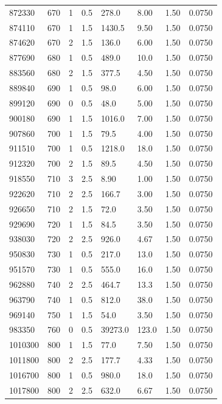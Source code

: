 \documentclass[preview]{standalone}
\begin{document}
{{{{\begin{tabular}{L{1.2cm}C{1.2cm} C{0.3cm}C{0.5cm} C{1.4cm}C{1.4cm} C{1.4cm}C{1.4cm}}
  872330  &   670  & 1     & 0.5 &  278.0  & 8.00  & 1.50 &  0.0750   \\ 
  874110  &   670  & 1     & 1.5 &  1430.5  & 9.50  & 1.50 &  0.0750   \\ 
  874620  &   670  & 2     & 1.5 &  136.0  & 6.00  & 1.50 &  0.0750   \\ 
  877690  &   680  & 1     & 0.5 &  489.0  & 10.0  & 1.50 &  0.0750   \\ 
  883560  &   680  & 2     & 1.5 &  377.5  & 4.50  & 1.50 &  0.0750   \\ 
  889840  &   690  & 1     & 0.5 &  98.0  & 6.00  & 1.50 &  0.0750   \\ 
  899120  &   690  & 0     & 0.5 &  48.0  & 5.00  & 1.50 &  0.0750   \\ 
  900180  &   690  & 1     & 1.5 &  1016.0  & 7.00  & 1.50 &  0.0750   \\ 
  907860  &   700  & 1     & 1.5 &  79.5  & 4.00  & 1.50 &  0.0750   \\ 
  911510  &   700  & 1     & 0.5 &  1218.0  & 18.0  & 1.50 &  0.0750   \\ 
  912320  &   700  & 2     & 1.5 &  89.5  & 4.50  & 1.50 &  0.0750   \\ 
  918550  &   710  & 3     & 2.5 &  8.90  & 1.00  & 1.50 &  0.0750   \\ 
  922620  &   710  & 2     & 2.5 &  166.7  & 3.00  & 1.50 &  0.0750   \\ 
  926650  &   710  & 2     & 1.5 &  72.0  & 3.50  & 1.50 &  0.0750   \\ 
  929690  &   720  & 1     & 1.5 &  84.5  & 3.50  & 1.50 &  0.0750   \\ 
  938030  &   720  & 2     & 2.5 &  926.0  & 4.67  & 1.50 &  0.0750   \\ 
  950830  &   730  & 1     & 0.5 &  217.0  & 13.0  & 1.50 &  0.0750   \\ 
  951570  &   730  & 1     & 0.5 &  555.0  & 16.0  & 1.50 &  0.0750   \\ 
  962880  &   740  & 2     & 2.5 &  464.7  & 13.3  & 1.50 &  0.0750   \\ 
  963790  &   740  & 1     & 0.5 &  812.0  & 38.0  & 1.50 &  0.0750   \\ 
  969140  &   750  & 1     & 1.5 &  54.0  & 3.50  & 1.50 &  0.0750   \\ 
  983350  &   760  & 0     & 0.5 &  39273.0  & 123.0  & 1.50 &  0.0750   \\ 
  1010300  &   800  & 1     & 1.5 &  77.0  & 7.50  & 1.50 &  0.0750   \\ 
  1011800  &   800  & 2     & 2.5 &  177.7  & 4.33  & 1.50 &  0.0750   \\ 
  1016700  &   800  & 1     & 0.5 &  980.0  & 18.0  & 1.50 &  0.0750   \\ 
  1017800  &   800  & 2     & 2.5 &  632.0  & 6.67  & 1.50 &  0.0750   \\ 
\hline 
\end{tabular} 

}}}}
\end{document}
